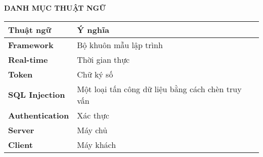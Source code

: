 \documentclass[../DoAn.tex]{subfiles}
\begin{document}
\begin{center}
    \Large{\textbf{DANH MỤC THUẬT NGỮ}}\\
\end{center}
\begin{longtable}{l p{9.5cm}}
	\hline
   \textbf{Thuật ngữ}  & \textbf{Ý nghĩa} \\ \hline 
	\textbf{Framework} & Bộ khuôn mẫu lập trình \\
	\textbf{Real-time} & Thời gian thực \\
	\textbf{Token} & Chữ ký số \\
	\textbf{SQL Injection} & Một loại tấn công dữ liệu bằng cách chèn truy vấn \\
	\textbf{Authentication}  &  Xác thực \\
    \textbf{Server}  &  Máy chủ \\
    \textbf{Client}  &  Máy khách \\

    \hline
\end{longtable}
\end{document}
